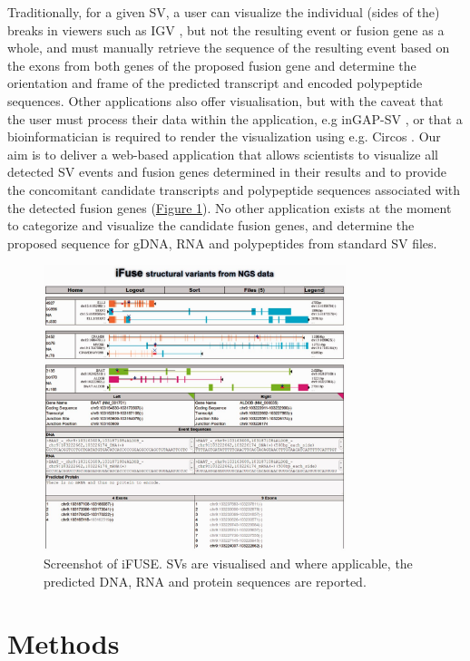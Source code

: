 Traditionally, for a given SV, a user can visualize the individual (sides of the) breaks in viewers such as IGV \cite{thorvaldsdottir2013integrative,robinson2011integrative}, but not the resulting event or fusion gene as a whole, and must manually retrieve the sequence of the resulting event based on the exons from both genes of the proposed fusion gene and determine the orientation and frame of the predicted transcript and encoded polypeptide sequences. Other applications also offer visualisation, but with the caveat that the user must process their data within the application, e.g inGAP-SV \cite{qi2011ingap}, or that a bioinformatician is required to render the visualization using e.g. Circos \cite{krzywinski2009circos}. Our aim is to deliver a web-based application that allows scientists to visualize all detected SV events and fusion genes determined in their results and to provide the concomitant candidate transcripts and polypeptide sequences associated with the detected fusion genes (\hyperref[fig:screenshot]{Figure \ref*{fig:screenshot}}). No other application exists at the moment to categorize and visualize the candidate fusion genes, and determine the proposed sequence for gDNA, RNA and polypeptides from standard SV files.

\begin{figure}
\centerline{\includegraphics[width=250pt]{chapters/images/iFUSE/ifusess.jpeg}}
\caption{Screenshot of iFUSE. SVs are visualised and where applicable, the predicted DNA, RNA and protein sequences are reported.}
\label{fig:screenshot}
\end{figure}


\section*{Methods}

